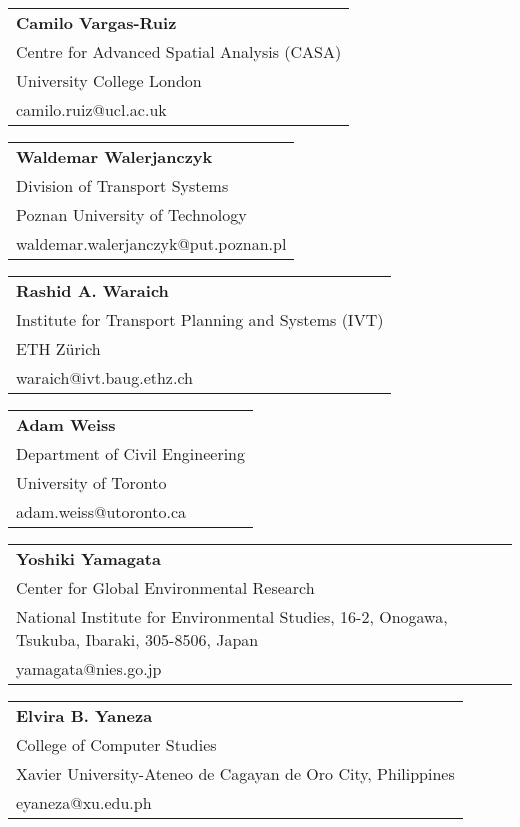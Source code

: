\begin{tabular}[width=0.48\textwidth]{@{}l}
\textbf{Camilo Vargas-Ruiz} \\
Centre for Advanced Spatial Analysis (CASA) \\
University College London \\
camilo.ruiz@ucl.ac.uk \\
\end{tabular}

\begin{tabular}[width=0.48\textwidth]{@{}l}
\textbf{Waldemar Walerjanczyk} \\
Division of Transport Systems \\
Poznan University of Technology \\
waldemar.walerjanczyk@put.poznan.pl \\
\end{tabular}

\begin{tabular}[width=0.48\textwidth]{@{}l}
\textbf{Rashid A. Waraich} \\
Institute for Transport Planning and Systems (IVT) \\
ETH Zürich \\
waraich@ivt.baug.ethz.ch \\
\end{tabular}

\begin{tabular}[width=0.48\textwidth]{@{}l}
\textbf{Adam Weiss} \\
Department of Civil Engineering \\
University of Toronto \\
adam.weiss@utoronto.ca  \\
\end{tabular}

\begin{tabular}[width=0.48\textwidth]{@{}l}
\textbf{Yoshiki Yamagata} \\
Center for Global Environmental Research \\
National Institute for Environmental Studies, 16-2, Onogawa, Tsukuba, Ibaraki, 305-8506, Japan \\
yamagata@nies.go.jp  \\
\end{tabular}

\begin{tabular}[width=0.48\textwidth]{@{}l}
\textbf{Elvira B. Yaneza} \\
College of Computer Studies \\
Xavier University-Ateneo de Cagayan de Oro City, Philippines \\
eyaneza@xu.edu.ph  \\
\end{tabular}

